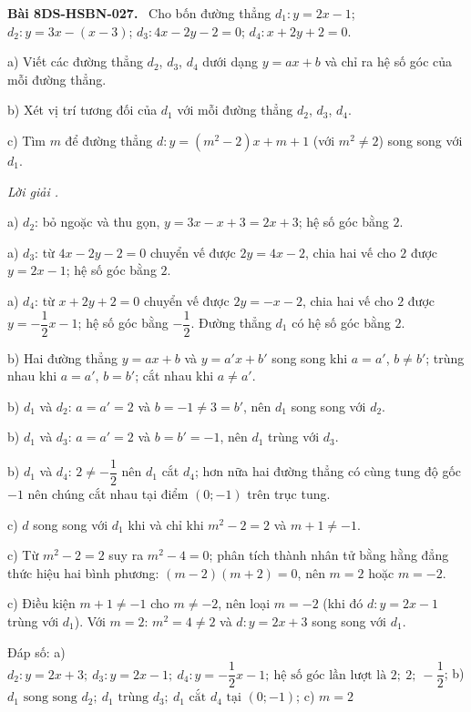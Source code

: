 \documentclass[12pt,a4paper]{article}
\newenvironment{problem}[1][]{\par\medskip\noindent\textbf{Bài #1.}\ }{\par}
\newenvironment{solution}[1][]{\par\noindent\textit{Lời giải #1.}\par}{\par}
\begin{document}
\begin{problem}[8DS-HSBN-027]
Cho bốn đường thẳng $d_1\colon y = 2x - 1$; $d_2\colon y = 3x - (x - 3)$; $d_3\colon 4x - 2y - 2 = 0$; $d_4\colon x + 2y + 2 = 0$.

a) Viết các đường thẳng $d_2$, $d_3$, $d_4$ dưới dạng $y = ax + b$ và chỉ ra hệ số góc của mỗi đường thẳng.

b) Xét vị trí tương đối của $d_1$ với mỗi đường thẳng $d_2$, $d_3$, $d_4$.

c) Tìm $m$ để đường thẳng $d\colon y = (m^2 - 2)x + m + 1$ (với $m^2 \neq 2$) song song với $d_1$.

\begin{solution}
a) $d_2$: bỏ ngoặc và thu gọn, $y = 3x - x + 3 = 2x + 3$; hệ số góc bằng $2$.

a) $d_3$: từ $4x - 2y - 2 = 0$ chuyển vế được $2y = 4x - 2$, chia hai vế cho $2$ được $y = 2x - 1$; hệ số góc bằng $2$.

a) $d_4$: từ $x + 2y + 2 = 0$ chuyển vế được $2y = -x - 2$, chia hai vế cho $2$ được $y = -\dfrac{1}{2}x - 1$; hệ số góc bằng $-\dfrac{1}{2}$. Đường thẳng $d_1$ có hệ số góc bằng $2$.

b) Hai đường thẳng $y = ax + b$ và $y = a'x + b'$ song song khi $a = a'$, $b \neq b'$; trùng nhau khi $a = a'$, $b = b'$; cắt nhau khi $a \neq a'$.

b) $d_1$ và $d_2$: $a = a' = 2$ và $b = -1 \neq 3 = b'$, nên $d_1$ song song với $d_2$.

b) $d_1$ và $d_3$: $a = a' = 2$ và $b = b' = -1$, nên $d_1$ trùng với $d_3$.

b) $d_1$ và $d_4$: $2 \neq -\dfrac{1}{2}$ nên $d_1$ cắt $d_4$; hơn nữa hai đường thẳng có cùng tung độ gốc $-1$ nên chúng cắt nhau tại điểm $(0; -1)$ trên trục tung.

c) $d$ song song với $d_1$ khi và chỉ khi $m^2 - 2 = 2$ và $m + 1 \neq -1$.

c) Từ $m^2 - 2 = 2$ suy ra $m^2 - 4 = 0$; phân tích thành nhân tử bằng hằng đẳng thức hiệu hai bình phương: $(m - 2)(m + 2) = 0$, nên $m = 2$ hoặc $m = -2$.

c) Điều kiện $m + 1 \neq -1$ cho $m \neq -2$, nên loại $m = -2$ (khi đó $d\colon y = 2x - 1$ trùng với $d_1$). Với $m = 2$: $m^2 = 4 \neq 2$ và $d\colon y = 2x + 3$ song song với $d_1$.

Đáp số: a) $\boxed{d_2\colon y = 2x + 3;\ d_3\colon y = 2x - 1;\ d_4\colon y = -\dfrac{1}{2}x - 1;\ \text{hệ số góc lần lượt là } 2;\ 2;\ -\dfrac{1}{2}}$; b) $\boxed{d_1 \text{ song song } d_2;\ d_1 \text{ trùng } d_3;\ d_1 \text{ cắt } d_4 \text{ tại } (0; -1)}$; c) $\boxed{m = 2}$
\end{solution}
\end{problem}
\end{document}
